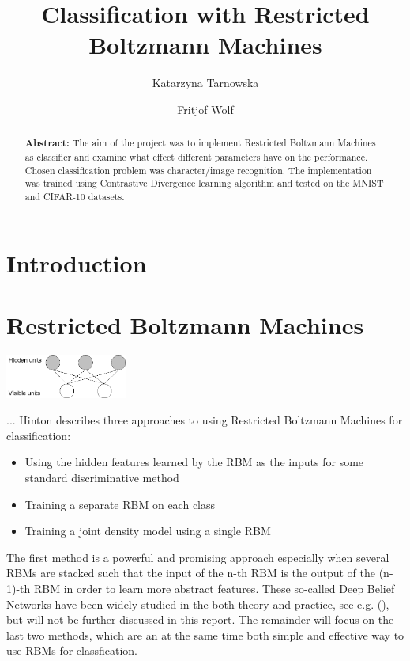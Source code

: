\documentclass[a4paper]{scrartcl}
\begin{document}
\title{Classification with Restricted Boltzmann Machines}
\author{Katarzyna Tarnowska \and Fritjof Wolf}
\maketitle

\begin{abstract}
\textbf{Abstract:}
The aim of the project was to implement Restricted Boltzmann Machines as classifier and examine what effect different parameters have on the performance. Chosen classification problem was character/image recognition. The implementation was trained using Contrastive Divergence learning algorithm and tested on the MNIST and CIFAR-10 datasets. 
\end{abstract}
\newpage

\section{Introduction}


\section{Restricted Boltzmann Machines}
\begin{center}
\includegraphics[width=4cm]{images/rbm.png}
\end{center} 
...
Hinton \cite{Hinton} describes three approaches to using Restricted Boltzmann Machines for classification:
\begin{itemize}
    \item Using the hidden features learned by the RBM as the inputs for some standard discriminative method
    \item Training a separate RBM on each class
	\item Training a joint density model using a single RBM
\end{itemize}
The first method is a powerful and promising approach especially when several RBMs are stacked such that the input of the n-th RBM is the output of the (n-1)-th RBM in order to learn more abstract features. These so-called Deep Belief Networks have been widely studied in the both theory and practice, see e.g. (\cite{DeepBelief}), but will not be further discussed in this report. The remainder will focus on the last two methods, which are an at the same time both simple and effective way to use RBMs for classfication. 
\end{document}
